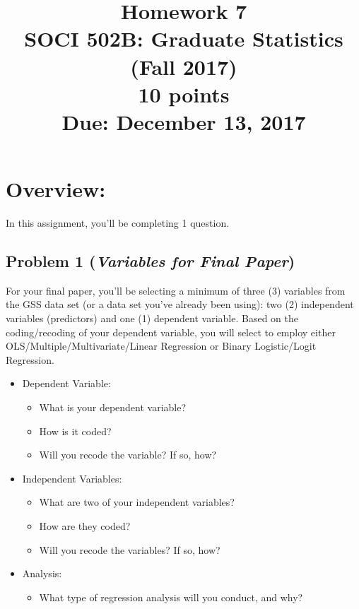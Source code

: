 \documentclass{article}
\begin{document}
\title{Homework 7\\ SOCI 502B: Graduate Statistics (Fall 2017) \\ {\large{10 points}} \\ {\large{Due: December 13, 2017}}}
\author[*]{}
\date{}
\maketitle



\section*{Overview:}
In this assignment, you'll be completing 1 question.

\subsection*{Problem 1 (\textit{Variables for Final Paper})}
For your final paper, you'll be selecting a minimum of three (3) variables from the GSS data set (or a data set you've already been using): two (2) independent variables (predictors) and one (1) dependent variable. Based on the coding/recoding of your dependent variable, you will select to employ either OLS/Multiple/Multivariate/Linear Regression or Binary Logistic/Logit Regression. 
\begin{itemize}
\item Dependent Variable:
\begin{itemize}
\item What is your dependent variable?
\item How is it coded?
\item Will you recode the variable? If so, how?
\end{itemize}
\item Independent Variables:
\begin{itemize}
\item What are two of your independent variables?
\item How are they coded?
\item Will you recode the variables? If so, how?
\end{itemize}
\item Analysis:
\begin{itemize}
\item What type of regression analysis will you conduct, and why?
\end{itemize}
\end{itemize}
\end{document}
